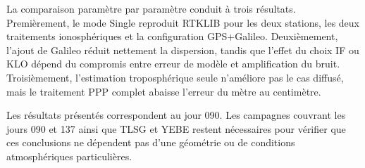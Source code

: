 La comparaison paramètre par paramètre conduit à trois résultats. Premièrement,
le mode Single reproduit RTKLIB pour les deux stations, les deux traitements
ionosphériques et la configuration GPS+Galileo. Deuxièmement, l'ajout de
Galileo réduit nettement la dispersion, tandis que l'effet du choix IF ou KLO
dépend du compromis entre erreur de modèle et amplification du bruit.
Troisièmement, l'estimation troposphérique seule n'améliore pas le cas diffusé,
mais le traitement PPP complet abaisse l'erreur du mètre au centimètre.

Les résultats présentés correspondent au jour 090. Les campagnes couvrant les
jours 090 et 137 ainsi que TLSG et YEBE restent nécessaires pour vérifier que
ces conclusions ne dépendent pas d'une géométrie ou de conditions
atmosphériques particulières.
